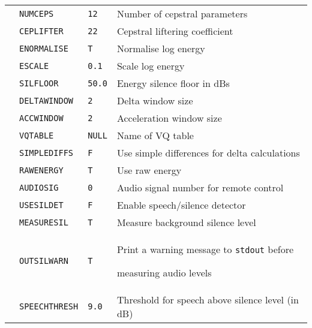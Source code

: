 \begin{center}
\begin{supertabular}{|p{1.8cm}|l|l|p{6.6cm}|}
  & \texttt{NUMCEPS}   & \texttt{12} & Number of cepstral parameters \\  


  & \texttt{CEPLIFTER} &   \texttt{22} & Cepstral liftering coefficient \\ 


  & \texttt{ENORMALISE} & \texttt{T} & Normalise log energy \\  


  & \texttt{ESCALE} & \texttt{0.1} & Scale log energy \\   


  & \texttt{SILFLOOR} & \texttt{50.0} & Energy silence floor in dBs \\   


  & \texttt{DELTAWINDOW} & \texttt{2} & Delta window size \\  


  & \texttt{ACCWINDOW} & \texttt{2} & Acceleration window size \\  


  & \texttt{VQTABLE} & \texttt{NULL} & Name of VQ table \\  


  & \texttt{SIMPLEDIFFS} & \texttt{F} & Use simple differences for delta calculations \\ 


  & \texttt{RAWENERGY}  & \texttt{T} & Use raw energy \\ 


  & \texttt{AUDIOSIG} & \texttt{0} & Audio signal number for remote control \\ 


  & \texttt{USESILDET}  & \texttt{F} & Enable speech/silence detector \\ 


  & \texttt{MEASURESIL} & \texttt{T} & Measure background silence level \\ 




  & \texttt{OUTSILWARN} & \texttt{T} & Print a warning message to {\tt stdout} before 


measuring audio levels \\ 


  & \texttt{SPEECHTHRESH} & \texttt{9.0} & Threshold for speech above silence level (in dB) \\ 



\end{supertabular}
\end{center}
